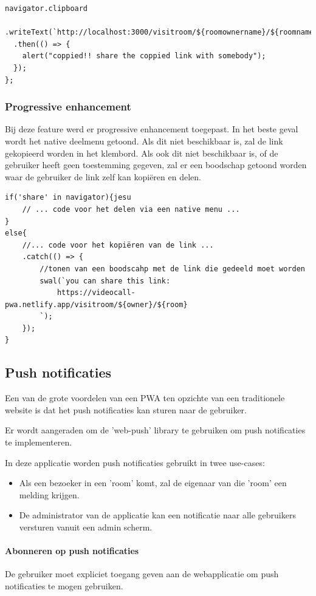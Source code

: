 \begin{lstlisting}
navigator.clipboard
  .writeText(`http://localhost:3000/visitroom/${roomownername}/${roomname}`)
  .then(() => {
    alert("coppied!! share the coppied link with somebody");
  });
};
\end{lstlisting}

		\subsubsection{Progressive enhancement}

			Bij deze feature werd er progressive enhancement toegepast. 
			In het beste geval wordt het native deelmenu getoond. Als dit niet beschikbaar is, zal de link gekopieerd worden in het klembord.
			Als ook dit niet beschikbaar is, of de gebruiker heeft geen toestemming gegeven, zal er een boodschap getoond worden waar de gebruiker de link zelf kan kopiëren en delen.
		
\begin{lstlisting}
if('share' in navigator){jesu
	// ... code voor het delen via een native menu ...
}
else{
	//... code voor het kopiëren van de link ...
	.catch(() => {
		//tonen van een boodscahp met de link die gedeeld moet worden
		swal(`you can share this link:
			https://videocall-pwa.netlify.app/visitroom/${owner}/${room}
		`);
	});
}
\end{lstlisting}


	\subsection{Push notificaties}
	
		Een van de grote voordelen van een PWA ten opzichte van een traditionele website is dat het push notificaties kan sturen naar de gebruiker.
		
		Er wordt aangeraden om de 'web-push' library te gebruiken om push notificaties te implementeren.
		
		In deze applicatie worden push notificaties gebruikt in twee use-cases:
		\begin{itemize}
			\item 	Als een bezoeker in een 'room' komt, zal de eigenaar van die 'room' een melding krijgen.
			\item 	De administrator van de applicatie kan een notificatie naar alle gebruikers versturen vanuit een admin scherm.
		\end{itemize}	
		
		\paragraph{Abonneren op push notificaties}
			 De gebruiker moet expliciet toegang geven aan de webapplicatie om push notificaties te mogen gebruiken.
			 
